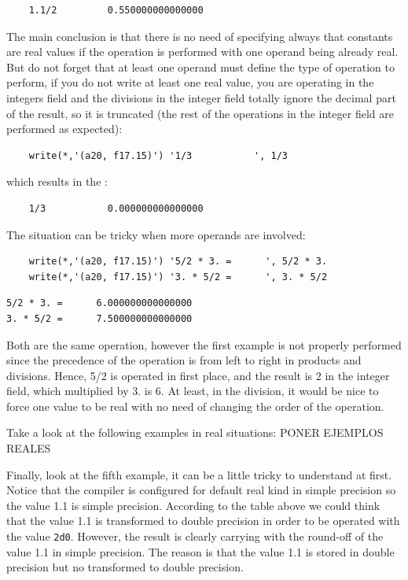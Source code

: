 \begin{verbatim}
    1.1/2         0.550000000000000
\end{verbatim}

The main conclusion is that there is no need of specifying always that constants are real values if the operation is performed with one operand being already real. But do not forget that at least one operand must define the type of operation to perform, if you do not write at least one real value, you are operating in the integers field and the divisions in the integer field totally ignore the decimal part of the result, so it is truncated (the rest of the operations in the integer field are performed as expected):

\begin{verbatim}
    write(*,'(a20, f17.15)') '1/3           ', 1/3
\end{verbatim}

which results in the :

\begin{verbatim}
    1/3           0.000000000000000
\end{verbatim}

The situation can be tricky when more operands are involved: 

\begin{verbatim}
    write(*,'(a20, f17.15)') '5/2 * 3. =      ', 5/2 * 3.
    write(*,'(a20, f17.15)') '3. * 5/2 =      ', 3. * 5/2
\end{verbatim}

\begin{verbatim}
5/2 * 3. =      6.000000000000000
3. * 5/2 =      7.500000000000000
\end{verbatim}

Both are the same operation, however the first example is not properly performed since the precedence of the operation is from left to right in products and divisions. Hence, 5/2 is operated in first place, and the result is 2 in the integer field, which multiplied by 3. is 6. At least, in the division, it would be nice to force one value to be real with no need of changing the order of the operation. 

Take a look at the following examples in real situations:
PONER EJEMPLOS REALES


Finally, look at the fifth example, it can be a little tricky to understand at first. Notice that the compiler is configured for default real kind in simple precision so the value 1.1 is simple precision. According to the table above we could think that the value 1.1 is transformed to double precision in order to be operated with the value \texttt{2d0}. However, the result is clearly carrying with the round-off of the value 1.1 in simple precision. The reason is that the value 1.1 is stored in double precision but no transformed to double precision. 

